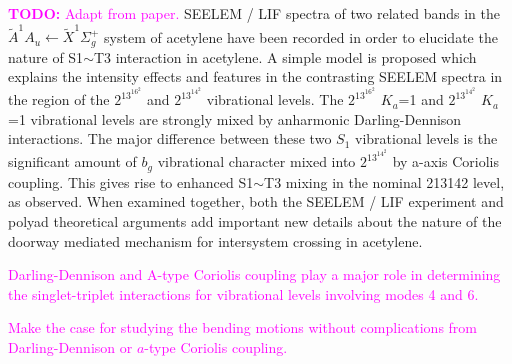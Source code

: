 \documentclass[12pt,draft]{mitthesis}
\newcommand{\TODO} [1]{\textcolor{magenta}{\textbf{TODO:} #1}}
\newcommand{\POINT}[1]{\textcolor{magenta}{#1}}
\begin{document}
\TODO{Adapt from paper.}  SEELEM / LIF spectra of two related bands in
the $\tilde{A}^1A_u \leftarrow \tilde{X} ^1\Sigma_g^+$ system of
acetylene have been recorded in order to elucidate the nature of
S1$\sim$T3 interaction in acetylene. A simple model is proposed which
explains the intensity effects and features in the contrasting SEELEM
spectra in the region of the $2^13^16^2$ and $2^13^14^2$ vibrational
levels. The $2^13^16^2$ $K_a$=1 and $2^13^14^2$ $K_a$=1 vibrational
levels are strongly mixed by anharmonic Darling-Dennison
interactions. The major difference between these two $S_1$ vibrational
levels is the significant amount of $b_g$ vibrational character mixed
into $2^13^14^2$ by a-axis Coriolis coupling. This gives rise to
enhanced S1$\sim$T3 mixing in the nominal 213142 level, as observed.
When examined together, both the SEELEM / LIF experiment and polyad
theoretical arguments add important new details about the nature of
the doorway mediated mechanism for intersystem crossing in acetylene.

\POINT{Darling-Dennison and A-type Coriolis coupling play a major role
  in determining the singlet-triplet interactions for vibrational
  levels involving modes 4 and 6.}

\POINT{Make the case for studying the bending motions without
  complications from Darling-Dennison or $a$-type Coriolis coupling.}



\end{document}
